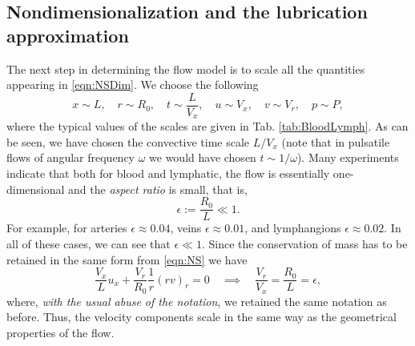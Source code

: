 \documentclass[12pt,a4paper]{article}
\begin{document}
\subsection{Nondimensionalization and the lubrication approximation}
The next step in determining the flow model is to scale all the quantities appearing in \eqref{eqn:NSDim}. We choose the following
\begin{equation}\label{eqn:Scales}
	x \sim L, \quad r \sim R_0, \quad t \sim \frac{L}{V_x}, \quad u \sim V_x, \quad v \sim V_r, \quad p \sim P,
\end{equation}
where the typical values of the scales are given in Tab. \ref{tab:BloodLymph}. As can be seen, we have chosen the convective time scale $L/V_x$ (note that in pulsatile flows of angular frequency $\omega$ we would have chosen $t \sim 1/\omega$). Many experiments indicate that both for blood and lymphatic, the flow is essentially one-dimensional and the \textit{aspect ratio} is small, that is,
\begin{equation}\label{eqn:AspectRatio}
	\epsilon := \frac{R_0}{L} \ll 1.
\end{equation}
For example, for arteries $\epsilon \approx 0.04$, veins $\epsilon \approx 0.01 $, and lymphangions $\epsilon \approx 0.02$. In all of these cases, we can see that $\epsilon\ll 1$. Since the conservation of mass has to be retained in the same form from \eqref{eqn:NS} we have
\begin{equation}
	\frac{V_x}{L} u_x + \frac{V_r}{R_0} \frac{1}{r} \left(r v\right)_r = 0 \quad \implies \quad \frac{V_r}{V_x} = \frac{R_0}{L} = \epsilon,
\end{equation}
where, \textit{with the usual abuse of the notation}, we retained the same notation as before. Thus, the velocity components scale in the same way as the geometrical properties of the flow. 
\end{document}
